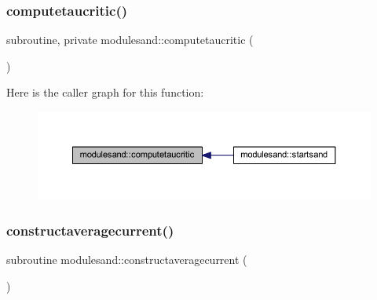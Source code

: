 \subsubsection{\texorpdfstring{computetaucritic()}{computetaucritic()}}
{\footnotesize\ttfamily subroutine, private modulesand\+::computetaucritic (\begin{DoxyParamCaption}{ }\end{DoxyParamCaption})\hspace{0.3cm}{\ttfamily [private]}}

Here is the caller graph for this function\+:\nopagebreak
\begin{figure}[H]
\begin{center}
\leavevmode
\includegraphics[width=350pt]{namespacemodulesand_a59ce9cc4ddca10eedae7fbc2ca0c2583_icgraph}
\end{center}
\end{figure}
\mbox{\label{namespacemodulesand_a04e1a85e46e9df0c79bdc0d537788c96}} 
\subsubsection{\texorpdfstring{constructaveragecurrent()}{constructaveragecurrent()}}
{\footnotesize\ttfamily subroutine modulesand\+::constructaveragecurrent (\begin{DoxyParamCaption}{ }\end{DoxyParamCaption})\hspace{0.3cm}{\ttfamily [private]}}


